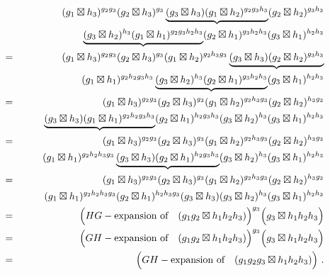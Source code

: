\begin{eqnarray*}
  &   &  (g_1 \boxtimes h_{3})^{g_2g_{3}}   (g_2 \boxtimes h_{3})^{g_{3}} 
          \underbrace{(g_{3}\boxtimes h_{3})   (g_1 \boxtimes h_2)^{g_2g_{3}h_{3}}} 
           (g_2 \boxtimes h_2)^{g_{3}h_{3}} \\
  &   &  \qquad
         \underbrace{(g_{3}\boxtimes h_2)^{h_{3}}  
          (g_1 \boxtimes h_1)^{g_2g_{3}h_2h_{3}}}  
           (g_2 \boxtimes h_1)^{g_{3}h_2h_{3}}   
            (g_{3}\boxtimes h_1)^{h_2h_{3}} \\
  & = &  (g_1 \boxtimes h_{3})^{g_2g_{3}}   (g_2 \boxtimes h_{3})^{g_{3}} 
          (g_1 \boxtimes h_2)^{g_2h_{3}g_{3}}   \underbrace{(g_{3}\boxtimes h_{3}) 
           (g_2 \boxtimes h_2)^{g_{3}h_{3}}} \\
  &   &  \qquad
         (g_1 \boxtimes h_1)^{g_2h_2g_{3}h_{3}}  
          \underbrace{(g_{3}\boxtimes h_2)^{h_{3}}  
           (g_2 \boxtimes h_1)^{g_{3}h_2h_{3}}}  
            (g_{3}\boxtimes h_1)^{h_2h_{3}} \\
  & = &  (g_1 \boxtimes h_{3})^{g_2g_{3}}   (g_2 \boxtimes h_{3})^{g_{3}}  
          (g_1 \boxtimes h_2)^{g_2h_{3}g_{3}} 
           (g_2 \boxtimes h_2)^{h_{3}g_{3}} \\
  &   &  \qquad
         \underbrace{(g_{3}\boxtimes h_{3})  
          (g_1 \boxtimes h_1)^{g_2h_2g_{3}h_{3}}} 
           (g_2 \boxtimes h_1)^{h_2g_{3}h_{3}}   (g_{3}\boxtimes h_2)^{h_{3}} 
            (g_{3}\boxtimes h_1)^{h_2h_{3}} \\
  & = &  (g_1 \boxtimes h_{3})^{g_2g_{3}}   (g_2 \boxtimes h_{3})^{g_{3}}  
          (g_1 \boxtimes h_2)^{g_2h_{3}g_{3}}  
           (g_2 \boxtimes h_2)^{h_{3}g_{3}} \\
  &   &  \qquad
         (g_1 \boxtimes h_1)^{g_2h_2h_{3}g_{3}}  
          \underbrace{(g_{3}\boxtimes h_{3})   (g_2 \boxtimes h_1)^{h_2g_{3}h_{3}}} 
           (g_{3}\boxtimes h_2)^{h_{3}}   (g_{3}\boxtimes h_1)^{h_2h_{3}} \\
  & = &  (g_1 \boxtimes h_{3})^{g_2g_{3}}   (g_2 \boxtimes h_{3})^{g_{3}} 
          (g_1 \boxtimes h_2)^{g_2h_{3}g_{3}} 
           (g_2 \boxtimes h_2)^{h_{3}g_{3}} \\
  &   &  \qquad
         (g_1 \boxtimes h_1)^{g_2h_2h_{3}g_{3}} 
          (g_2 \boxtimes h_1)^{h_2h_{3}g_{3}}   (g_{3}\boxtimes h_{3})  
           (g_{3}\boxtimes h_2)^{h_{3}}   (g_{3}\boxtimes h_1)^{h_2h_{3}} \\
  & = &  \Big(HG-\mbox{expansion of} \quad(g_1g_2
          \boxtimes h_1h_2h_{3})\Big)^{g_{3}}\Big(g_{3}\boxtimes h_1h_2h_{3}\Big) \\
  & = &  \Big(GH-\mbox{expansion of} \quad(g_1g_2
          \boxtimes h_1h_2h_{3})\Big)^{g_{3}}\Big(g_{3}\boxtimes h_1h_2h_{3}\Big) \\
  & = &  \Big(GH-\mbox{expansion of} 
          \quad(g_1g_2g_{3}\boxtimes h_1h_2h_{3})\Big) ~.
\end{eqnarray*}

